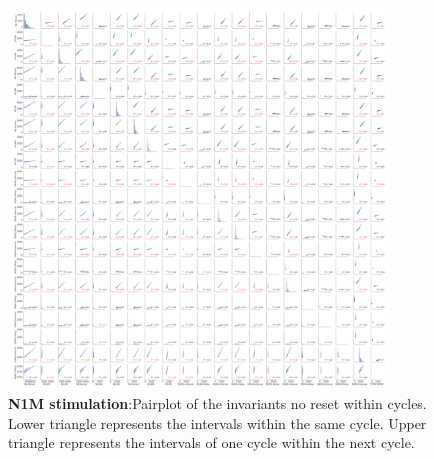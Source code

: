 \begin{figure}[htbp]
	\centering
	\includegraphics[width=0.9\textwidth]{./invariants/data/MODEL/n1m_driven/images/3phases/_output_pairplot_reset.png}
	\caption{\textbf{N1M stimulation}:Pairplot of the invariants no reset within cycles. Lower triangle represents the intervals within the same cycle. Upper triangle represents the intervals of one cycle within the next cycle. }
	\label{fig:N1M stimulation pairplot reset}
\end{figure}

